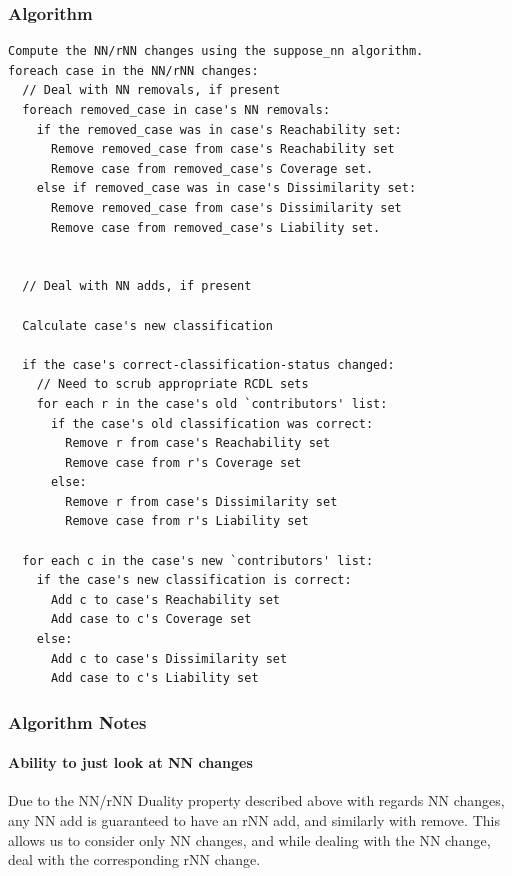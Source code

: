 \documentclass[a4paper,11pt]{report}
\begin{document}
\begin{samepage}

\subsubsection{Algorithm}
{\small 
\begin{verbatim}
Compute the NN/rNN changes using the suppose_nn algorithm.
foreach case in the NN/rNN changes:
  // Deal with NN removals, if present
  foreach removed_case in case's NN removals:
    if the removed_case was in case's Reachability set:
      Remove removed_case from case's Reachability set
      Remove case from removed_case's Coverage set.
    else if removed_case was in case's Dissimilarity set:
      Remove removed_case from case's Dissimilarity set
      Remove case from removed_case's Liability set.


  // Deal with NN adds, if present  
  
  Calculate case's new classification
  
  if the case's correct-classification-status changed:
    // Need to scrub appropriate RCDL sets
    for each r in the case's old `contributors' list:
      if the case's old classification was correct:
        Remove r from case's Reachability set
        Remove case from r's Coverage set
      else:
        Remove r from case's Dissimilarity set
        Remove case from r's Liability set
        
  for each c in the case's new `contributors' list:
    if the case's new classification is correct:
      Add c to case's Reachability set
      Add case to c's Coverage set
    else:
      Add c to case's Dissimilarity set
      Add case to c's Liability set

\end{verbatim}
}
\end{samepage}

\subsubsection{Algorithm Notes}
\paragraph{Ability to just look at NN changes}
Due to the NN/rNN Duality property described above with regards NN changes, any NN add is guaranteed to have an rNN add, and similarly with remove. This allows us to consider only NN changes, and while dealing with the NN change, deal with the corresponding rNN change.
\end{document}
